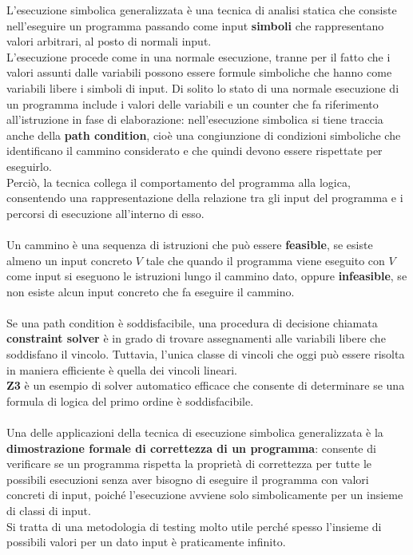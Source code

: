 \documentclass[a4paper, 12pt, oneside]{book}
\theoremstyle{normal}
\begin{document}
L'esecuzione simbolica \cite{king1976symbolic} generalizzata è una tecnica di analisi statica che consiste nell'eseguire un programma passando come input \textbf{simboli} che rappresentano valori arbitrari, al posto di normali input. \\ L'esecuzione procede come in una normale esecuzione, tranne per il fatto che i valori assunti dalle variabili possono essere formule simboliche che hanno come variabili libere i simboli di input. Di solito lo stato di una normale esecuzione di un programma include i valori delle variabili e un counter che fa riferimento all'istruzione in fase di elaborazione: nell'esecuzione simbolica si tiene traccia anche della \textbf{path condition}, cioè una congiunzione di condizioni simboliche che identificano il cammino considerato e che quindi devono essere rispettate per eseguirlo. \\ Perciò, la tecnica collega il comportamento del programma alla logica, consentendo una rappresentazione della relazione tra gli input del programma e i percorsi di esecuzione all'interno di esso. \\ \\ Un cammino è una sequenza di istruzioni che può essere \textbf{feasible}, se esiste almeno un input concreto $V$ tale che quando il programma viene eseguito con $V$ come input si eseguono le istruzioni lungo il cammino dato, oppure \textbf{infeasible}, se non esiste alcun input concreto che fa eseguire il cammino. \\ \\ Se una path condition è soddisfacibile, una procedura di decisione chiamata \textbf{constraint solver} è in grado di trovare assegnamenti alle variabili libere che soddisfano il vincolo. Tuttavia, l'unica classe di vincoli che oggi può essere risolta in maniera efficiente è quella dei vincoli lineari. \\ \textbf{Z3} \cite{de2008z3} è un esempio di solver automatico efficace che consente di determinare se una formula di logica del primo ordine è soddisfacibile.
\\ \\ Una delle applicazioni della tecnica di esecuzione simbolica generalizzata è la \textbf{dimostrazione formale di correttezza di un programma}: consente di verificare se un programma rispetta la proprietà di correttezza per tutte le possibili esecuzioni senza aver bisogno di eseguire il programma con valori concreti di input, poiché l'esecuzione avviene solo simbolicamente per un insieme di classi di input. \\ Si tratta di una metodologia di testing molto utile perché spesso l'insieme di possibili valori per un dato input è praticamente infinito.
\end{document}
